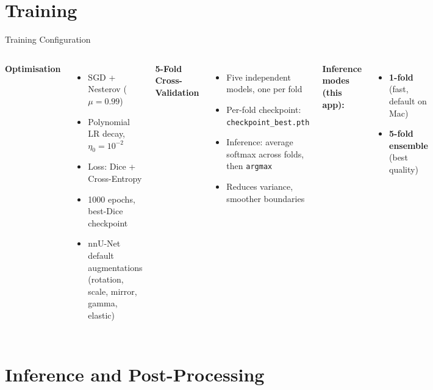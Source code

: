 \documentclass[aspectratio=169,11pt]{beamer}
\begin{document}
\section{Training}

\begin{frame}{Training Configuration}
  \begin{columns}[T,onlytextwidth]
    \textbf{Optimisation}
    \begin{itemize}
      \item SGD + Nesterov ($\mu = 0.99$)
      \item Polynomial LR decay, $\eta_0 = 10^{-2}$
      \item Loss: Dice + Cross-Entropy
      \item 1000 epochs, best-Dice checkpoint
      \item nnU-Net default augmentations \\
            (rotation, scale, mirror, gamma, elastic)
    \end{itemize}

    \textbf{5-Fold Cross-Validation}
    \begin{itemize}
      \item Five independent models, one per fold
      \item Per-fold checkpoint: \texttt{checkpoint\_best.pth}
      \item Inference: average softmax across folds, then \texttt{argmax}
      \item Reduces variance, smoother boundaries
    \end{itemize}
    \vspace{0.5em}
    \textbf{Inference modes (this app):}
    \begin{itemize}
      \item \textbf{1-fold} (fast, default on Mac)
      \item \textbf{5-fold ensemble} (best quality)
    \end{itemize}
  \end{columns}
\end{frame}

\section{Inference and Post-Processing}
\end{document}
